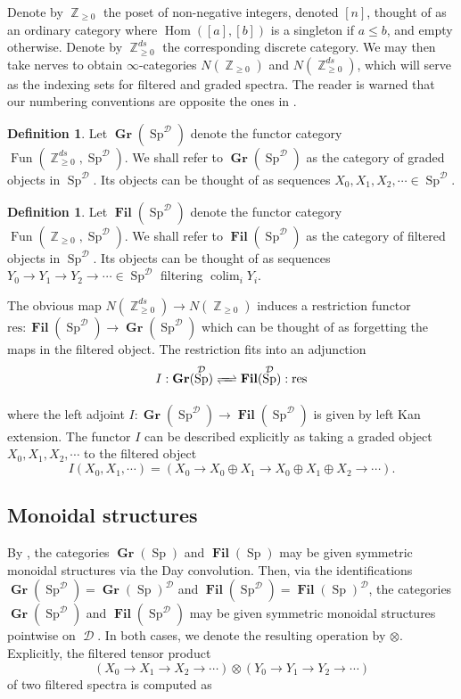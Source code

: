 \documentclass[reqno, oneside]{amsart}
\theoremstyle{definition}
\newtheorem{dfn}[nul]{Definition}
\theoremstyle{plain}
\DeclareMathOperator*{\colim}{\text{colim}}
\DeclareMathOperator{\Hom}{\text{Hom}}
\DeclareMathOperator{\D}{\mathcal{D}}
\DeclareMathOperator{\Z}{\mathbb{Z}}
\DeclareMathOperator{\Gr}{\textbf{Gr}}
\DeclareMathOperator{\Fil}{\textbf{Fil}}
\DeclareMathOperator{\Fun}{\text{Fun}}
\DeclareMathOperator{\Sp}{\text{Sp}}
\begin{document}
Denote by $\Z_{\geq 0}$ the poset of non-negative integers, denoted $[n]$, thought of as an ordinary category where $\Hom([a],[b])$ is a singleton if $a\leq b$, and empty otherwise.  Denote by $\Z_{\geq 0}^{ds}$ the corresponding discrete category.  We may then take nerves to obtain $\infty$-categories $N(\Z_{\geq 0})$ and $N(\Z_{\geq 0}^{ds})$, which will serve as the indexing sets for filtered and graded spectra.  The reader is warned that our numbering conventions are opposite the ones in \cite{LurieRot}.

\begin{dfn} 
Let $\Gr(\Sp^{\D})$ denote the functor category $\Fun(\Z_{\geq 0}^{ds}, \Sp^{\D}).$  We shall refer to $\Gr(\Sp^{\D})$ as the category of graded objects in $\Sp^{\D}$.  Its objects can be thought of as sequences $X_0, X_1,X_2,\cdots \in \Sp^{\D}$.
\end{dfn}

\begin{dfn} 
Let $\Fil(\Sp^{\D})$ denote the functor category $\Fun(\Z_{\geq 0}, \Sp^{\D}).$  We shall refer to $\Fil(\Sp^{\D})$ as the category of filtered objects in $\Sp^{\D}$.  Its objects can be thought of as sequences $Y_0\to Y_1\to Y_2 \to \cdots \in \Sp^{\D}$ filtering $\colim_i Y_i$.  
\end{dfn}


The obvious map $N(\Z_{\geq 0}^{ds}) \to N(\Z_{\geq 0})$ induces a restriction functor $\text{res}: \Fil(\Sp^{\D}) \to \Gr(\Sp^{\D})$ which can be thought of as forgetting the maps in the filtered object.  The restriction fits into an adjunction  
$$I:\Gr(\Sp^{\D}) \xrightleftharpoons{\quad} \Fil(\Sp^{\D}) : \text{res}$$

where the left adjoint $I: \Gr(\Sp^{\D}) \to \Fil(\Sp^{\D})$ is given by left Kan extension.  The functor $I$ can be described explicitly as taking a graded object $X_0,X_1,X_2,\cdots$ to the filtered object $$I(X_0, X_1, \cdots) = (X_0\to X_0\oplus X_1\to X_0 \oplus X_1\oplus X_2\to \cdots).$$   


\subsection{Monoidal structures}\label{sect:monoidal}
By \cite[Corollary 2.3.9]{LurieRot}, the categories $\Gr(\Sp)$ and $\Fil(\Sp)$ may be given symmetric monoidal structures via the Day convolution.  Then, via the identifications $\Gr(\Sp^{\D}) = \Gr(\Sp)^{\D}$ and $\Fil(\Sp^{\D}) = \Fil(\Sp)^{\D}$, the categories $\Gr(\Sp^{\D})$ and $\Fil(\Sp^{\D})$ may be given symmetric monoidal structures pointwise on $\D$.  In both cases, we denote the resulting operation by $\otimes$.  Explicitly, the filtered tensor product $$\left(X_0 \longrightarrow X_1 \longrightarrow X_2 \longrightarrow \cdots \right) \otimes \left(Y_0 \longrightarrow Y_1 \longrightarrow Y_2 \longrightarrow \cdots \right)$$
of two filtered spectra is computed as
\end{document}

